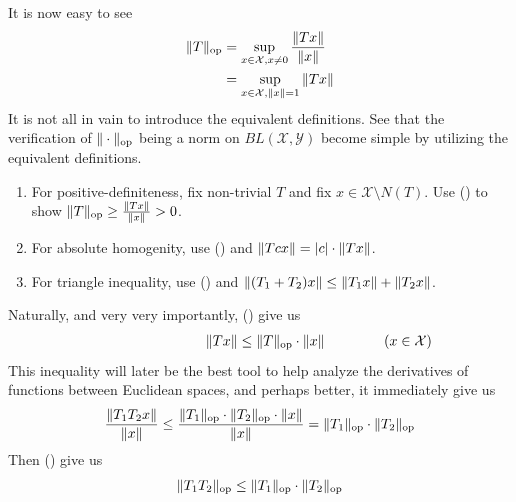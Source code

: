 \documentclass{report}
\begin{document}
\begin{mdframed}
It is now easy to see 
\begin{align}
  \| T \|_{\text{op}}&=\sup_{x \in \mathcal{X},x\neq 0} \frac{\| Tx \|}{\| x \|}\label{equivdefopnorm1}\\
&=\sup_{x\in \mathcal{X},\| x \|=1} \| Tx \|\label{equivdefopnorm}
\end{align}
It is not all in vain to introduce the equivalent definitions. See that the verification of  $\| \cdot \|_{\text{op}}$ being a norm on $BL(\mathcal{X},\mathcal{Y})$ become simple by utilizing the equivalent definitions. 
\begin{enumerate}[label=(\alph*)]
  \item For positive-definiteness, fix non-trivial $T$ and fix $x\in \mathcal{X}\setminus N(T)$. Use () to show $\| T \|_{\text{op}}\geq \frac{\| Tx \|}{\| x \|}>0$. 
  \item For absolute homogenity, use () and $\| Tcx \|=\left|c\right|\cdot \| Tx \|$.
  \item For triangle inequality, use () and $\| (T_1+T_2)x \|\leq \| T_1x \|+\| T_2x \|$. 
\end{enumerate}
Naturally, and very very importantly, () give us 
\begin{align*}
\hspace{3cm}\norm{Tx}\leq \norm{T}_\text{op}\cdot \norm{x}\hspace{1.5cm}(x\in \mathcal{X})
\end{align*}
This inequality will later be the best tool to help analyze the derivatives of functions between Euclidean spaces, and perhaps better, it immediately give us 
\begin{align*}
 \frac{\| T_1T_2x \|}{\| x \|}\leq \frac{\| T_1 \|_\text{op}\cdot \| T_2 \|_\text{op}\cdot \| x \|}{\| x \|}=\| T_1 \|_\text{op}\cdot \| T_2 \|_{\text{op}}
\end{align*}
Then () give us  
\begin{align*}
\| T_1T_2 \|_\text{op}\leq \| T_1 \|_\text{op}\cdot \| T_2 \|_\text{op}
\end{align*}
\end{mdframed}
\end{document}
